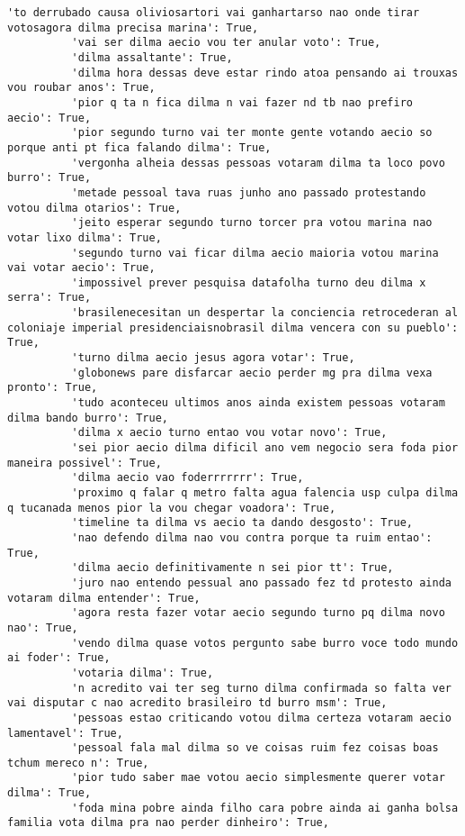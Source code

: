 \documentclass[11pt]{article}
\begin{document}
\begin{Verbatim}[commandchars=\\\{\}]
          'to derrubado causa oliviosartori vai ganhartarso nao onde tirar votosagora dilma precisa marina': True,
          'vai ser dilma aecio vou ter anular voto': True,
          'dilma assaltante': True,
          'dilma hora dessas deve estar rindo atoa pensando ai trouxas vou roubar anos': True,
          'pior q ta n fica dilma n vai fazer nd tb nao prefiro aecio': True,
          'pior segundo turno vai ter monte gente votando aecio so porque anti pt fica falando dilma': True,
          'vergonha alheia dessas pessoas votaram dilma ta loco povo burro': True,
          'metade pessoal tava ruas junho ano passado protestando votou dilma otarios': True,
          'jeito esperar segundo turno torcer pra votou marina nao votar lixo dilma': True,
          'segundo turno vai ficar dilma aecio maioria votou marina vai votar aecio': True,
          'impossivel prever pesquisa datafolha turno deu dilma x serra': True,
          'brasilenecesitan un despertar la conciencia retrocederan al coloniaje imperial presidenciaisnobrasil dilma vencera con su pueblo': True,
          'turno dilma aecio jesus agora votar': True,
          'globonews pare disfarcar aecio perder mg pra dilma vexa pronto': True,
          'tudo aconteceu ultimos anos ainda existem pessoas votaram dilma bando burro': True,
          'dilma x aecio turno entao vou votar novo': True,
          'sei pior aecio dilma dificil ano vem negocio sera foda pior maneira possivel': True,
          'dilma aecio vao foderrrrrrr': True,
          'proximo q falar q metro falta agua falencia usp culpa dilma q tucanada menos pior la vou chegar voadora': True,
          'timeline ta dilma vs aecio ta dando desgosto': True,
          'nao defendo dilma nao vou contra porque ta ruim entao': True,
          'dilma aecio definitivamente n sei pior tt': True,
          'juro nao entendo pessual ano passado fez td protesto ainda votaram dilma entender': True,
          'agora resta fazer votar aecio segundo turno pq dilma novo nao': True,
          'vendo dilma quase votos pergunto sabe burro voce todo mundo ai foder': True,
          'votaria dilma': True,
          'n acredito vai ter seg turno dilma confirmada so falta ver vai disputar c nao acredito brasileiro td burro msm': True,
          'pessoas estao criticando votou dilma certeza votaram aecio lamentavel': True,
          'pessoal fala mal dilma so ve coisas ruim fez coisas boas tchum mereco n': True,
          'pior tudo saber mae votou aecio simplesmente querer votar dilma': True,
          'foda mina pobre ainda filho cara pobre ainda ai ganha bolsa familia vota dilma pra nao perder dinheiro': True,

\end{Verbatim}
\end{document}
